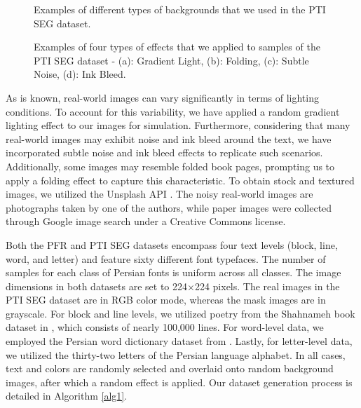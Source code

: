 \documentclass[conference]{IEEEtran}
\begin{document}
\begin{figure}[h] 
\caption{Examples of different types of backgrounds that we used in the PTI SEG dataset.}
\label{fig:backgrounds}
\end{figure}  
\begin{figure}[t] \label{fig4} 
\caption{Examples of four types of effects that we applied to samples of the PTI SEG dataset - (a): Gradient Light, (b): Folding, (c): Subtle Noise, (d): Ink Bleed.}
\label{fig:effects}
\end{figure}  
As is known, real-world images can vary significantly in terms of lighting conditions. To account for this variability, we have applied a random gradient lighting effect to our images for simulation. Furthermore, considering that many real-world images may exhibit noise and ink bleed around the text, we have incorporated subtle noise and ink bleed effects to replicate such scenarios. Additionally, some images may resemble folded book pages, prompting us to apply a folding effect to capture this characteristic.
To obtain stock and textured images, we utilized the Unsplash API \cite{30}. The noisy real-world images are photographs taken by one of the authors, while paper images were collected through Google image search under a Creative Commons license.

Both the PFR and PTI SEG datasets encompass four text levels (block, line, word, and letter) and feature sixty different font typefaces. The number of samples for each class of Persian fonts is uniform across all classes. The image dimensions in both datasets are set to 224$\times$224 pixels. The real images in the PTI SEG dataset are in RGB color mode, whereas the mask images are in grayscale.
For block and line levels, we utilized poetry from the Shahnameh book dataset in \cite{13}, which consists of nearly 100,000 lines. For word-level data, we employed the Persian word dictionary dataset from \cite{14}. Lastly, for letter-level data, we utilized the thirty-two letters of the Persian language alphabet. In all cases, text and colors are randomly selected and overlaid onto random background images, after which a random effect is applied.
Our dataset generation process is detailed in Algorithm \ref{alg1}.
\end{document}
